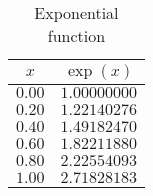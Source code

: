 \begin{table}[!hbtp]
\centering
\caption{Exponential function}
\label{tab:exp}
\begin{tabular}{cc}
\hline
   $x$ &    $\exp(x)$ \\
\hline
$0.00$ & $1.00000000$ \\
$0.20$ & $1.22140276$ \\
$0.40$ & $1.49182470$ \\
$0.60$ & $1.82211880$ \\
$0.80$ & $2.22554093$ \\
$1.00$ & $2.71828183$ \\
\hline
\end{tabular}
\end{table}
